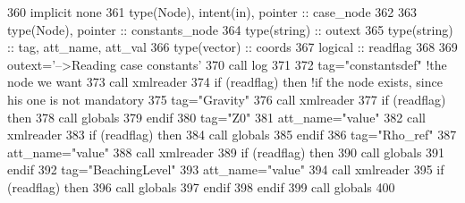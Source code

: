 \begin{DoxyCode}
360     \textcolor{keywordtype}{implicit none}
361     \textcolor{keywordtype}{type}(Node), \textcolor{keywordtype}{intent(in)}, \textcolor{keywordtype}{pointer} :: case\_node
362 
363     \textcolor{keywordtype}{type}(Node), \textcolor{keywordtype}{pointer} :: constants\_node
364     \textcolor{keywordtype}{type}(string) :: outext
365     \textcolor{keywordtype}{type}(string) :: tag, att\_name, att\_val
366     \textcolor{keywordtype}{type}(vector) :: coords
367     \textcolor{keywordtype}{logical} :: readflag
368 
369     outext=\textcolor{stringliteral}{'-->Reading case constants'}
370     \textcolor{keyword}{call }log%
371 
372     tag=\textcolor{stringliteral}{"constantsdef"}    \textcolor{comment}{!the node we want}
373     \textcolor{keyword}{call }xmlreader%
374     \textcolor{keywordflow}{if} (readflag) \textcolor{keywordflow}{then} \textcolor{comment}{!if the node exists, since his one is not mandatory}
375         tag=\textcolor{stringliteral}{"Gravity"}
376         \textcolor{keyword}{call }xmlreader%
377         \textcolor{keywordflow}{if} (readflag) \textcolor{keywordflow}{then}
378             \textcolor{keyword}{call }globals%
379 \textcolor{keywordflow}{        endif}
380         tag=\textcolor{stringliteral}{"Z0"}
381         att\_name=\textcolor{stringliteral}{"value"}
382         \textcolor{keyword}{call }xmlreader%
383         \textcolor{keywordflow}{if} (readflag) \textcolor{keywordflow}{then}
384             \textcolor{keyword}{call }globals%
385 \textcolor{keywordflow}{        endif}
386         tag=\textcolor{stringliteral}{"Rho\_ref"}
387         att\_name=\textcolor{stringliteral}{"value"}
388         \textcolor{keyword}{call }xmlreader%
389         \textcolor{keywordflow}{if} (readflag) \textcolor{keywordflow}{then}
390             \textcolor{keyword}{call }globals%
391 \textcolor{keywordflow}{        endif}
392         tag=\textcolor{stringliteral}{"BeachingLevel"}
393         att\_name=\textcolor{stringliteral}{"value"}
394         \textcolor{keyword}{call }xmlreader%
395         \textcolor{keywordflow}{if} (readflag) \textcolor{keywordflow}{then}
396             \textcolor{keyword}{call }globals%
397 \textcolor{keywordflow}{        endif}
398 \textcolor{keywordflow}{    endif}
399     \textcolor{keyword}{call }globals%
400 
\end{DoxyCode}

